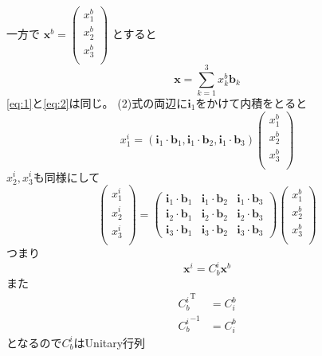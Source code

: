 \documentclass[class=article, crop=false, dvipdfmx, fleqn]{standalone}
\begin{document}
一方で
$\bm{x}^b=
    \begin{pmatrix}
    	x^b_1\\
        x^b_2\\
        x^b_3\\
    \end{pmatrix}$
とすると
\begin{equation}
\bm{x} = \sum_{k=1}^{3} x^b_k \bm{b}_k  \label{eq:2}
\end{equation}
\eqref{eq:1}と\eqref{eq:2}は同じ。
(2)式の両辺に$\bm{i}_1$をかけて内積をとると
\[ x^i_1 =
	\left(
		\bm{i}_1 \cdot \bm{b}_1,
        \bm{i}_1 \cdot \bm{b}_2,
        \bm{i}_1 \cdot \bm{b}_3
    \right)
	\begin{pmatrix}
    	x^b_1\\
        x^b_2\\
        x^b_3\\
    \end{pmatrix}
\]
$x^i_2, x^i_3$も同様にして
\[
\begin{pmatrix}
	x^i_1\\
    x^i_2\\
    x^i_3\\
\end{pmatrix}
=
\begin{pmatrix}
	\bm{i}_1 \cdot \bm{b}_1 & 
    \bm{i}_1 \cdot \bm{b}_2 & 
    \bm{i}_1 \cdot \bm{b}_3 \\
    \bm{i}_2 \cdot \bm{b}_1 &
    \bm{i}_2 \cdot \bm{b}_2 &
    \bm{i}_2 \cdot \bm{b}_3 \\
    \bm{i}_3 \cdot \bm{b}_1 & 
    \bm{i}_3 \cdot \bm{b}_2 & 
    \bm{i}_3 \cdot \bm{b}_3
\end{pmatrix}
\begin{pmatrix}
	x^b_1\\
    x^b_2\\
    x^b_3\\
\end{pmatrix}
\]
つまり
\[ \bm{x}^i = C^i_b\bm{x}^b\]
また
\begin{align}
{C_b^{i}}^\mathrm{T} & = C_i^b \\
{C_b^{i}}^{-1} & = C^b_i
\end{align}
となるので$C_b^i$はUnitary行列
\end{document}
